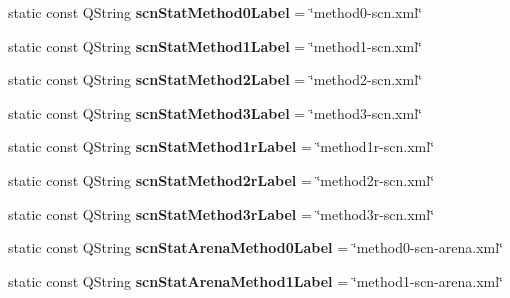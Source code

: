 \begin{DoxyCompactItemize}
\item 
\hypertarget{class_common_abfed8861463bdce7db8c4858fa7b6b14}{static const Q\+String {\bfseries scn\+Stat\+Method0\+Label} = \char`\"{}method0-\/scn.\+xml\char`\"{}}\label{class_common_abfed8861463bdce7db8c4858fa7b6b14}

\item 
\hypertarget{class_common_a21df8353ab6d88fb9f56a7bdcf79b47c}{static const Q\+String {\bfseries scn\+Stat\+Method1\+Label} = \char`\"{}method1-\/scn.\+xml\char`\"{}}\label{class_common_a21df8353ab6d88fb9f56a7bdcf79b47c}

\item 
\hypertarget{class_common_a03231c3e417c07ca60f40bea4dbb4efd}{static const Q\+String {\bfseries scn\+Stat\+Method2\+Label} = \char`\"{}method2-\/scn.\+xml\char`\"{}}\label{class_common_a03231c3e417c07ca60f40bea4dbb4efd}

\item 
\hypertarget{class_common_a9637fe414c9c7b197f085eb465ae7334}{static const Q\+String {\bfseries scn\+Stat\+Method3\+Label} = \char`\"{}method3-\/scn.\+xml\char`\"{}}\label{class_common_a9637fe414c9c7b197f085eb465ae7334}

\item 
\hypertarget{class_common_a5c09ec6d9b3430e77c576f2892fc5cec}{static const Q\+String {\bfseries scn\+Stat\+Method1r\+Label} = \char`\"{}method1r-\/scn.\+xml\char`\"{}}\label{class_common_a5c09ec6d9b3430e77c576f2892fc5cec}

\item 
\hypertarget{class_common_a9c19fffef937dbdd3662b98f1790b8dc}{static const Q\+String {\bfseries scn\+Stat\+Method2r\+Label} = \char`\"{}method2r-\/scn.\+xml\char`\"{}}\label{class_common_a9c19fffef937dbdd3662b98f1790b8dc}

\item 
\hypertarget{class_common_aa0ae2d6d2d9f0d626355f049acf1c28f}{static const Q\+String {\bfseries scn\+Stat\+Method3r\+Label} = \char`\"{}method3r-\/scn.\+xml\char`\"{}}\label{class_common_aa0ae2d6d2d9f0d626355f049acf1c28f}

\item 
\hypertarget{class_common_afb0abcc0a974b8c0ec97e2a4779c5bdf}{static const Q\+String {\bfseries scn\+Stat\+Arena\+Method0\+Label} = \char`\"{}method0-\/scn-\/arena.\+xml\char`\"{}}\label{class_common_afb0abcc0a974b8c0ec97e2a4779c5bdf}

\item 
\hypertarget{class_common_ac71eb13e0617cf42ba4582ade2241089}{static const Q\+String {\bfseries scn\+Stat\+Arena\+Method1\+Label} = \char`\"{}method1-\/scn-\/arena.\+xml\char`\"{}}\label{class_common_ac71eb13e0617cf42ba4582ade2241089}


\end{DoxyCompactItemize}
